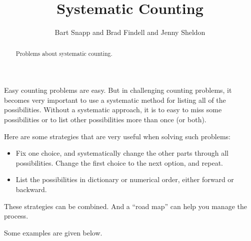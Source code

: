 \documentclass[nooutcomes]{ximera}
\title{Systematic Counting}
\author{Bart Snapp and Brad Findell and Jenny Sheldon}
\begin{document}
\begin{abstract}
Problems about systematic counting.
\end{abstract}
\maketitle


Easy counting problems are easy.  But in challenging counting problems, it becomes very important to use a systematic method for listing all of the possibilities.  Without a systematic approach, it is to easy to miss some possibilities or to    
list other possibilities more than once (or both). 

Here are some strategies that are very useful when solving such problems:  
\begin{itemize}
\item Fix one choice, and systematically change the other parts through all possibilities.  Change the first choice to the next option, and repeat.  
\item List the possibilities in dictionary or numerical order, either forward or backward. 
\end{itemize}
These strategies can be combined.  And a ``road map'' can help you manage the process.     


Some examples are given below. 
\end{document}
